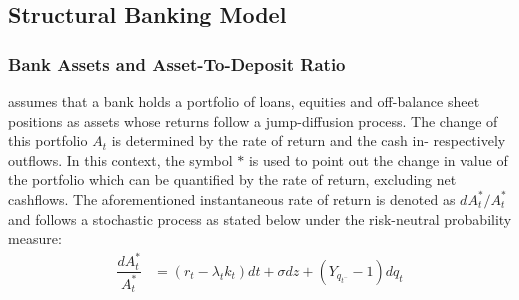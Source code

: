 \subsection{Structural Banking Model}
\subsubsection*{Bank Assets and Asset-To-Deposit Ratio}
\citet{pennacchi2010structural} assumes that a bank holds a portfolio of loans, equities and off-balance sheet positions as assets whose returns follow a jump-diffusion process. The change of this portfolio $A_t$ is determined by the rate of return and the cash in- respectively outflows. In this context, the symbol $*$ is used to point out the change in value of the portfolio which can be quantified by the rate of return, excluding net cashflows. The aforementioned instantaneous rate of return is denoted as $d A_t^*/ A_t^*$ and follows a stochastic process as stated below under the risk-neutral probability measure:
\begin{align} \label{bankassetprocess}
\dfrac{d A_t^*}{A_t^*} &= \left( r_t - \lambda_t k_t \right) dt + \sigma dz + \left( Y_{q_{t^{-}}} -1\right) dq_t
\end{align}

